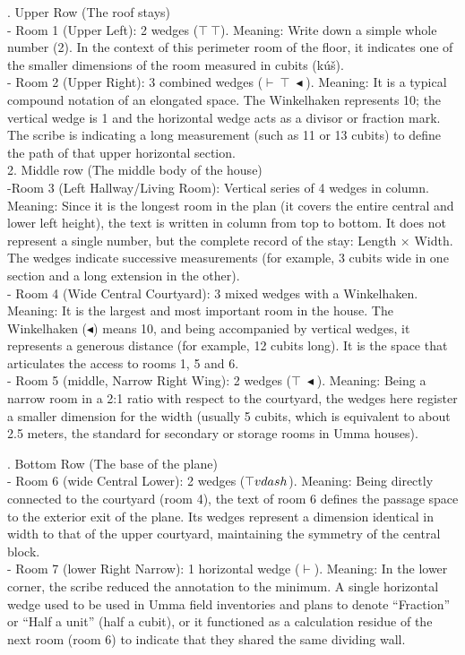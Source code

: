 \documentclass[11pt, a4paper]{article}
\begin{document}
\medskip{}. Upper Row (The roof stays)\\
-  Room 1 (Upper Left): 2 wedges ($\top\ \top$). Meaning: Write down a simple whole number (2). In the context of this perimeter room of the floor, it indicates one of the smaller dimensions of the room measured in cubits (kúš).\\[1ex]
- Room 2 (Upper Right): 3 combined wedges ($\vdash\ \top\ \blacktriangleleft$).
Meaning: It is a typical compound notation of an elongated space. The Winkelhaken represents 10; the vertical wedge is 1 and the horizontal wedge acts as a divisor or fraction mark. The scribe is indicating a long measurement (such as 11 or 13 cubits) to define the path of that upper horizontal section. \\[1ex]
2. Middle row (The middle body of the house)\\
-Room 3 (Left Hallway/Living Room): Vertical series of 4 wedges in column.
Meaning: Since it is the longest room in the plan (it covers the entire central and lower left height), the text is written in column from top to bottom. It does not represent a single number, but the complete record of the stay: Length × Width. The wedges indicate successive measurements (for example, 3 cubits wide in one section and a long extension in the other).\\
- Room 4 (Wide Central Courtyard): 3 mixed wedges with a Winkelhaken.
Meaning: It is the largest and most important room in the house. The Winkelhaken ($\blacktriangleleft$) means 10, and being accompanied by vertical wedges, it represents a generous distance (for example, 12 cubits long). It is the space that articulates the access to rooms 1, 5 and 6. \\
- Room 5 (middle, Narrow Right Wing): 2 wedges ($\top\ \blacktriangleleft$).
Meaning: Being a narrow room in a 2:1 ratio with respect to the courtyard, the wedges here register a smaller dimension for the width (usually 5 cubits, which is equivalent to about 2.5 meters, the standard for secondary or storage rooms in Umma houses).

\medskip{}. Bottom Row (The base of the plane)\\
- Room 6 (wide Central Lower): 2 wedges ($\top\\vdash$).
Meaning: Being directly connected to the courtyard (room 4), the text of room 6 defines the passage space to the exterior exit of the plane. Its wedges represent a dimension identical in width to that of the upper courtyard, maintaining the symmetry of the central block.\\
- Room 7 (lower Right Narrow): 1 horizontal wedge ($\vdash$). Meaning: In the lower corner, the scribe reduced the annotation to the minimum. A single horizontal wedge used to be used in Umma field inventories and plans to denote ``Fraction'' or ``Half a unit'' (half a cubit), or it functioned as a calculation residue of the next room (room 6) to indicate that they shared the same dividing wall.
\end{document}
